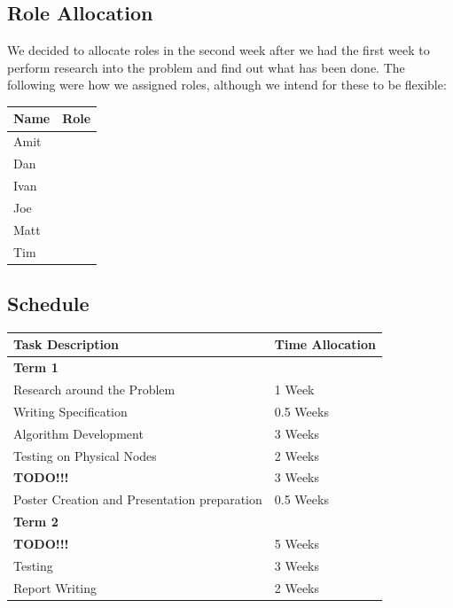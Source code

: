 \documentclass[a4paper]{article}
\begin{document}
\subsection{Role Allocation}

We decided to allocate roles in the second week after we had the first week to perform research into the problem and find out what has been done. The following were how we assigned roles, although we intend for these to be flexible:

\begin{table}[H]
	\centering
	\begin{tabular}{| l | l |}
	Name & Role \\
	\hline
	Amit & ~ \\
	Dan & ~ \\
	Ivan & ~ \\
	Joe & ~ \\
	Matt & ~ \\
	Tim & ~ \\
	\end{tabular}
\end{table}


\subsection{Schedule}


\begin{table}[H]
	\centering
	\begin{tabular}{| l | l |}
	Task Description & Time Allocation \\
	\hline
	\hline
	\multicolumn{2}{|l|}{\textbf{Term 1}} \\
	\hline

	Research around the Problem & 1 Week \\
	Writing Specification & 0.5 Weeks \\
	Algorithm Development & 3 Weeks \\
	Testing on Physical Nodes & 2 Weeks \\

	\textbf{TODO!!!} & 3 Weeks \\

	Poster Creation and Presentation preparation & 0.5 Weeks \\

	\hline
	\hline
	\multicolumn{2}{|l|}{\textbf{Term 2}} \\
	\hline

	\textbf{TODO!!!} & 5 Weeks \\

	Testing & 3 Weeks \\
	Report Writing & 2 Weeks \\
	
	\end{tabular}
\end{table}
\end{document}
